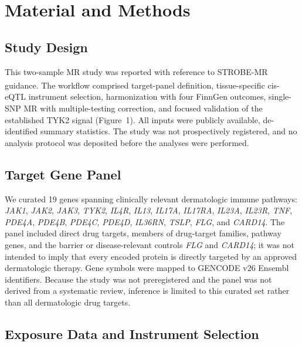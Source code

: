 \section*{Material and Methods}

\subsection*{Study Design}

This two-sample MR study was reported with reference to STROBE-MR guidance.\textsuperscript{\cite{skrivankova2021strobemr,burgess2021mr}} The workflow comprised target-panel definition, tissue-specific cis-eQTL instrument selection, harmonization with four FinnGen outcomes, single-SNP MR with multiple-testing correction, and focused validation of the established TYK2 signal (Figure~1). All inputs were publicly available, de-identified summary statistics. The study was not prospectively registered, and no analysis protocol was deposited before the analyses were performed.

\subsection*{Target Gene Panel}

We curated 19 genes spanning clinically relevant dermatologic immune pathways: \textit{JAK1}, \textit{JAK2}, \textit{JAK3}, \textit{TYK2}, \textit{IL4R}, \textit{IL13}, \textit{IL17A}, \textit{IL17RA}, \textit{IL23A}, \textit{IL23R}, \textit{TNF}, \textit{PDE4A}, \textit{PDE4B}, \textit{PDE4C}, \textit{PDE4D}, \textit{IL36RN}, \textit{TSLP}, \textit{FLG}, and \textit{CARD14}. The panel included direct drug targets, members of drug-target families, pathway genes, and the barrier or disease-relevant controls \textit{FLG} and \textit{CARD14}; it was not intended to imply that every encoded protein is directly targeted by an approved dermatologic therapy. Gene symbols were mapped to GENCODE v26 Ensembl identifiers. Because the study was not preregistered and the panel was not derived from a systematic review, inference is limited to this curated set rather than all dermatologic drug targets.

\subsection*{Exposure Data and Instrument Selection}

